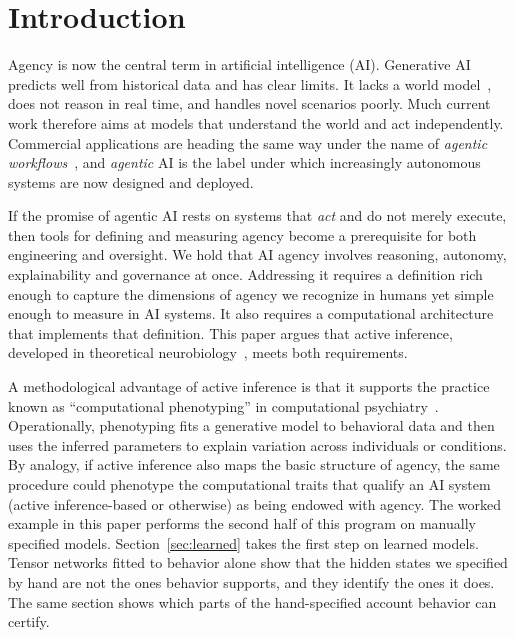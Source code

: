 \documentclass[letterpaper]{article} %
\theoremstyle{definition}
\begin{document}
\section{Introduction}\label{Introduction}

Agency is now the central term in artificial intelligence (AI). Generative AI predicts well from historical data and has clear limits. It lacks a world model~\citep{lecunPathAutonomousMachine2022}, does not reason in real time, and handles novel scenarios poorly. Much current work therefore aims at models that understand the world and act independently. Commercial applications are heading the same way under the name of \emph{agentic workflows}~\citep{ngAgenticDesignPatterns2024}, and \emph{agentic} AI is the label under which increasingly autonomous systems are now designed and deployed.

If the promise of agentic AI rests on systems that \emph{act} and do not merely execute, then tools for defining and measuring agency become a prerequisite for both engineering and oversight. We hold that AI agency involves reasoning, autonomy, explainability and governance at once. Addressing it requires a definition rich enough to capture the dimensions of agency we recognize in humans yet simple enough to measure in AI systems. It also requires a computational architecture that implements that definition. This paper argues that active inference, developed in theoretical neurobiology~\citep{parrActiveInferenceFree2022a}, meets both requirements.

A methodological advantage of active inference is that it supports the practice known as ``computational phenotyping'' in computational psychiatry~\citep{montagueComputationalPsychiatry2012,schwartenbeck2016computational,smithStepByStep2022}. Operationally, phenotyping fits a generative model to behavioral data and then uses the inferred parameters to explain variation across individuals or conditions. By analogy, if active inference also maps the basic structure of agency, the same procedure could phenotype the computational traits that qualify an AI system (active inference-based or otherwise) as being endowed with agency. The worked example in this paper performs the second half of this program on manually specified models. Section~\ref{sec:learned} takes the first step on learned models. Tensor networks fitted to behavior alone show that the hidden states we specified by hand are not the ones behavior supports, and they identify the ones it does. The same section shows which parts of the hand-specified account behavior can certify.
\end{document}

